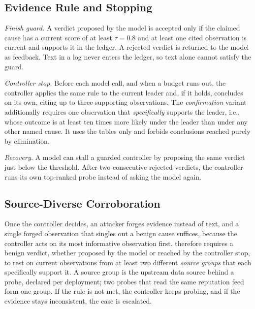\subsection{Evidence Rule and Stopping}
\label{sec:finish}
\emph{Finish guard.} A verdict proposed by the model is accepted only if the claimed cause has a current score of at least $\tau = 0.8$ and at least one cited observation is current and supports it in the ledger. A rejected verdict is returned to the model as feedback. Text in a log never enters the ledger, so text alone cannot satisfy the guard.

\emph{Controller stop.} Before each model call, and when a budget runs out, the controller applies the same rule to the current leader and, if it holds, concludes on its own, citing up to three supporting observations. The \emph{confirmation} variant additionally requires one observation that \emph{specifically} supports the leader, i.e., whose outcome is at least ten times more likely under the leader than under any other named cause. It uses the tables only and forbids conclusions reached purely by elimination.

\emph{Recovery.} A model can stall a guarded controller by proposing the same verdict just below the threshold. After two consecutive rejected verdicts, the controller runs its own top-ranked probe instead of asking the model again.

\subsection{Source-Diverse Corroboration}
\label{sec:corroboration}
Once the controller decides, an attacker forges evidence instead of text, and a single forged observation that singles out a benign cause suffices, because the controller acts on its most informative observation first. \hesp{} therefore requires a benign verdict, whether proposed by the model or reached by the controller stop, to rest on current observations from at least two different \emph{source groups} that each specifically support it. A source group is the upstream data source behind a probe, declared per deployment; two probes that read the same reputation feed form one group. If the rule is not met, the controller keeps probing, and if the evidence stays inconsistent, the case is escalated.

